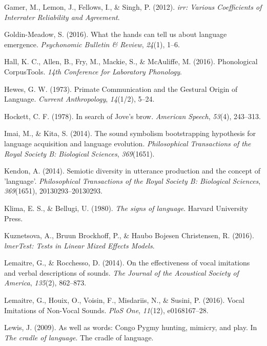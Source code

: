 \documentclass[english,floatsintext,man]{apa6}
\theoremstyle{definition}
\theoremstyle{definition}
\theoremstyle{remark}
\begin{document}
\hypertarget{ref-irr:2012}{}
Gamer, M., Lemon, J., Fellows, I., \& Singh, P. (2012). \emph{irr:
Various Coefficients of Interrater Reliability and Agreement}.

\hypertarget{ref-GoldinMeadow:2016bw}{}
Goldin-Meadow, S. (2016). What the hands can tell us about language
emergence. \emph{Psychonomic Bulletin \& Review}, \emph{24}(1), 1--6.

\hypertarget{ref-PCT:1.1}{}
Hall, K. C., Allen, B., Fry, M., Mackie, S., \& McAuliffe, M. (2016).
Phonological CorpusTools. \emph{14th Conference for Laboratory
Phonology}.

\hypertarget{ref-Hewes:1973vr}{}
Hewes, G. W. (1973). Primate Communication and the Gestural Origin of
Language. \emph{Current Anthropology}, \emph{14}(1/2), 5--24.

\hypertarget{ref-Hockett:1978se}{}
Hockett, C. F. (1978). In search of Jove's brow. \emph{American Speech},
\emph{53}(4), 243--313.

\hypertarget{ref-Imai:2014dea}{}
Imai, M., \& Kita, S. (2014). The sound symbolism bootstrapping
hypothesis for language acquisition and language evolution.
\emph{Philosophical Transactions of the Royal Society B: Biological
Sciences}, \emph{369}(1651).

\hypertarget{ref-Kendon:2014eg}{}
Kendon, A. (2014). Semiotic diversity in utterance production and the
concept of 'language'. \emph{Philosophical Transactions of the Royal
Society B: Biological Sciences}, \emph{369}(1651), 20130293--20130293.

\hypertarget{ref-Klima:1980si}{}
Klima, E. S., \& Bellugi, U. (1980). \emph{The signs of language}.
Harvard University Press.

\hypertarget{ref-lmerTest:2016}{}
Kuznetsova, A., Bruun Brockhoff, P., \& Haubo Bojesen Christensen, R.
(2016). \emph{lmerTest: Tests in Linear Mixed Effects Models}.

\hypertarget{ref-Lemaitre:2014kr}{}
Lemaitre, G., \& Rocchesso, D. (2014). On the effectiveness of vocal
imitations and verbal descriptions of sounds. \emph{The Journal of the
Acoustical Society of America}, \emph{135}(2), 862--873.

\hypertarget{ref-Lemaitre:2016kz}{}
Lemaitre, G., Houix, O., Voisin, F., Misdariis, N., \& Susini, P.
(2016). Vocal Imitations of Non-Vocal Sounds. \emph{PloS One},
\emph{11}(12), e0168167--28.

\hypertarget{ref-Lewis:2009wz}{}
Lewis, J. (2009). As well as words: Congo Pygmy hunting, mimicry, and
play. In \emph{The cradle of language}. The cradle of language.
\end{document}

